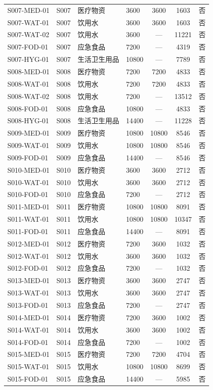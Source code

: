 \begin{center}
\begin{longtable}{llllccc}
S007-MED-01 & S007 & 医疗物资 & 3600 & 3600 & 1603 & 否 \\
S007-WAT-01 & S007 & 饮用水 & 3600 & 3600 & 1603 & 否 \\
S007-WAT-02 & S007 & 饮用水 & 3600 & — & 11221 & 否 \\
S007-FOD-01 & S007 & 应急食品 & 7200 & — & 4319 & 否 \\
S007-HYG-01 & S007 & 生活卫生用品 & 10800 & — & 7789 & 否 \\
S008-MED-01 & S008 & 医疗物资 & 7200 & 7200 & 4833 & 否 \\
S008-WAT-01 & S008 & 饮用水 & 7200 & 7200 & 4833 & 否 \\
S008-WAT-02 & S008 & 饮用水 & 7200 & — & 13512 & 否 \\
S008-FOD-01 & S008 & 应急食品 & 10800 & — & 4833 & 否 \\
S008-HYG-01 & S008 & 生活卫生用品 & 14400 & — & 11228 & 否 \\
S009-MED-01 & S009 & 医疗物资 & 10800 & 10800 & 8546 & 否 \\
S009-WAT-01 & S009 & 饮用水 & 10800 & 10800 & 8546 & 否 \\
S009-FOD-01 & S009 & 应急食品 & 14400 & — & 8546 & 否 \\
S010-MED-01 & S010 & 医疗物资 & 3600 & 3600 & 2712 & 否 \\
S010-WAT-01 & S010 & 饮用水 & 3600 & 3600 & 2712 & 否 \\
S010-FOD-01 & S010 & 应急食品 & 7200 & — & 2712 & 否 \\
S011-MED-01 & S011 & 医疗物资 & 10800 & 10800 & 8091 & 否 \\
S011-WAT-01 & S011 & 饮用水 & 10800 & 10800 & 10347 & 否 \\
S011-FOD-01 & S011 & 应急食品 & 14400 & — & 8091 & 否 \\
S012-MED-01 & S012 & 医疗物资 & 7200 & 3600 & 1032 & 否 \\
S012-WAT-01 & S012 & 饮用水 & 3600 & 3600 & 1032 & 否 \\
S012-FOD-01 & S012 & 应急食品 & 7200 & — & 1032 & 否 \\
S013-MED-01 & S013 & 医疗物资 & 3600 & 3600 & 2747 & 否 \\
S013-WAT-01 & S013 & 饮用水 & 3600 & 3600 & 2747 & 否 \\
S013-FOD-01 & S013 & 应急食品 & 7200 & — & 2747 & 否 \\
S014-MED-01 & S014 & 医疗物资 & 7200 & 3600 & 1002 & 否 \\
S014-WAT-01 & S014 & 饮用水 & 3600 & 3600 & 1002 & 否 \\
S014-FOD-01 & S014 & 应急食品 & 7200 & — & 1002 & 否 \\
S015-MED-01 & S015 & 医疗物资 & 7200 & 7200 & 4704 & 否 \\
S015-WAT-01 & S015 & 饮用水 & 10800 & 10800 & 8699 & 否 \\
S015-FOD-01 & S015 & 应急食品 & 14400 & — & 5985 & 否 \\
\hline\end{longtable}\end{center}
